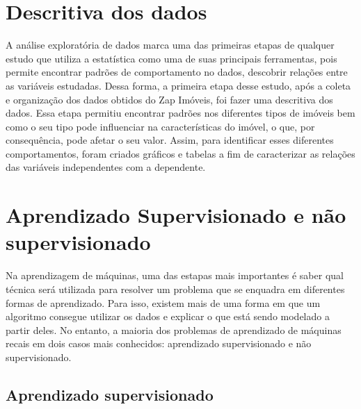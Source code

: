 \documentclass[
  letterpaper,
  DIV=11,
  numbers=noendperiod]{scrreprt}
\begin{document}
\section{Descritiva dos dados}\label{descritiva-dos-dados}

\hfill\break

A análise exploratória de dados marca uma das primeiras etapas de
qualquer estudo que utiliza a estatística como uma de suas principais
ferramentas, pois permite encontrar padrões de comportamento no dados,
descobrir relações entre as variáveis estudadas. Dessa forma, a primeira
etapa desse estudo, após a coleta e organização dos dados obtidos do Zap
Imóveis, foi fazer uma descritiva dos dados. Essa etapa permitiu
encontrar padrões nos diferentes tipos de imóveis bem como o seu tipo
pode influenciar na características do imóvel, o que, por consequência,
pode afetar o seu valor. Assim, para identificar esses diferentes
comportamentos, foram criados gráficos e tabelas a fim de caracterizar
as relações das variáveis independentes com a dependente.

\section{Aprendizado Supervisionado e não
supervisionado}\label{aprendizado-supervisionado-e-nuxe3o-supervisionado}

\hfill\break

Na aprendizagem de máquinas, uma das estapas mais importantes é saber
qual técnica será utilizada para resolver um problema que se enquadra em
diferentes formas de aprendizado. Para isso, existem mais de uma forma
em que um algoritmo consegue utilizar os dados e explicar o que está
sendo modelado a partir deles. No entanto, a maioria dos problemas de
aprendizado de máquinas recais em dois casos mais conhecidos:
aprendizado supervisionado e não supervisionado.

\subsection{Aprendizado
supervisionado}\label{aprendizado-supervisionado}

\hfill\break
\end{document}

